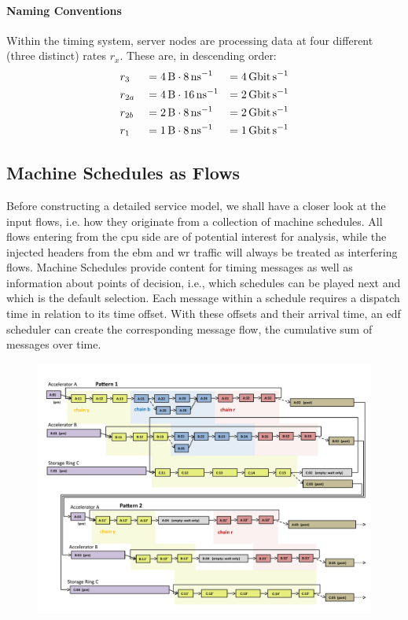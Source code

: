\paragraph{Naming Conventions}
Within the timing system, server nodes are processing data at four different (three distinct) rates $r_x$. These are, in descending order:
\begin{equation}
\begin{aligned}
\notag
&r_3 &&= \SI{4}{\byte} \cdot \SI{8}{\per\nano\second} &= \SI{4}{\giga\bit\per\second}\\
&r_{2a} &&= \SI{4}{\byte} \cdot  \SI{16}{\per\nano\second} &= \SI{2}{\giga\bit\per\second}\\
&r_{2b} &&= \SI{2}{\byte} \cdot  \SI{8}{\per\nano\second}  &= \SI{2}{\giga\bit\per\second}\\
&r_1 &&= \SI{1}{\byte} \cdot \SI{8}{\per\nano\second} &= \SI{1}{\giga\bit\per\second}
\label{eq:rates}
\end{aligned}
\end{equation}
%


\subsection{Machine Schedules as Flows}
\label{ssec:machine-flows}
Before constructing a detailed service model, we shall have a closer look at the input flows, i.e. how they originate from a collection of
machine schedules. All flows entering from the \gls{cpu} side are of potential interest for analysis, while the injected headers from the \gls{ebm} and \gls{wr} traffic will always be treated as interfering flows.
Machine Schedules provide content for timing messages as well as information about points of decision, i.e., which schedules can be played next and which is the default selection.
Each message within a schedule requires a dispatch time in relation to its time offset. With these offsets and their arrival time, an \gls{edf} scheduler can create the corresponding message flow,
the cumulative sum of messages over time.
%
\begin{figure}[H]
  \centering
  \includegraphics*[width=\textwidth,height=\textheight,keepaspectratio]{Figures/SchedExec}
\end{figure}
%
